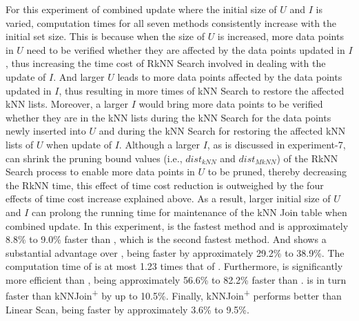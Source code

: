 For this experiment of combined update where the initial size of $U$ and $I$ is varied, computation times for all seven methods consistently increase with the initial set size. This is because when the size of $U$ is increased, more data points in $U$ need to be verified whether they are affected by the data points updated in $I$, thus increasing the time cost of RkNN Search involved in dealing with the update of $I$. And larger $U$ leads to more data points affected by the data points updated in $I$, thus resulting in more times of kNN Search to restore the affected kNN lists. Moreover, a larger $I$ would bring more data points to be verified whether they are in the kNN lists during the kNN Search for the data points newly inserted into $U$ and during the kNN Search for restoring the affected kNN lists of $U$ when update of $I$. Although a larger $I$, as is discussed in experiment-7, can shrink the pruning bound values (i.e., $dist_{kNN}$ and $dist_{MkNN}$) of the RkNN Search process to enable more data points in $U$ to be pruned, thereby decreasing the RkNN time, this effect of time cost reduction is outweighed by the four effects of time cost increase explained above. As a result, larger initial size of $U$ and $I$ can prolong the running time for maintenance of the kNN Join table when combined update. In this experiment, \cpdualtree is the fastest method and is approximately 8.8\% to 9.0\% faster than \spdualtree, which is the second fastest method. And \spdualtree shows a substantial advantage over \dualtree, being faster by approximately 29.2\% to 38.9\%. The computation time of \deltatree is at most 1.23 times that of \dualtree. Furthermore, \deltatree is significantly more efficient than \hdrtree, being approximately 56.6\% to 82.2\% faster than \hdrtree. \hdrtree is in turn faster than kNNJoin\textsuperscript{+} by up to 10.5\%. Finally, kNNJoin\textsuperscript{+} performs better than Linear Scan, being faster by approximately 3.6\% to 9.5\%.

